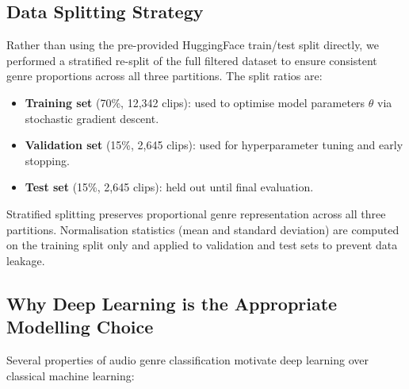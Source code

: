 \documentclass[12pt, a4paper]{article}
\begin{document}
\subsection{Data Splitting Strategy}

Rather than using the pre-provided HuggingFace train/test split directly,
we performed a stratified re-split of the full filtered dataset to ensure
consistent genre proportions across all three partitions. The split
ratios are:

\begin{itemize}[noitemsep, topsep=4pt]
    \item \textbf{Training set} (70\%, 12{,}342 clips): used to optimise
          model parameters $\theta$ via stochastic gradient descent.
    \item \textbf{Validation set} (15\%, 2{,}645 clips): used for
          hyperparameter tuning and early stopping.
    \item \textbf{Test set} (15\%, 2{,}645 clips): held out until
          final evaluation.
\end{itemize}

Stratified splitting preserves proportional genre representation across
all three partitions. Normalisation statistics (mean and standard deviation) are
computed on the training split only and applied to validation and test
sets to prevent data leakage.

\subsection{Why Deep Learning is the Appropriate Modelling Choice}

Several properties of audio genre classification motivate deep learning over classical
machine learning:
\end{document}
